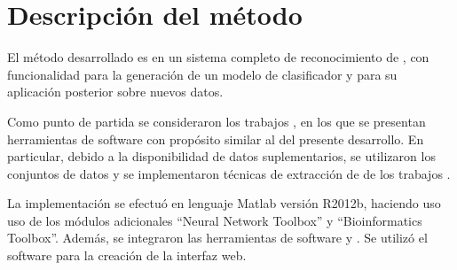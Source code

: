 %
%
%
%
\setcounter{chapter}{2}
%
\chapter{Descripción del método}
%
El método desarrollado es en un sistema completo de reconocimiento de
, con funcionalidad para la generación de un modelo de
clasificador y para su aplicación posterior sobre nuevos datos.

Como punto de partida se consideraron los trabajos
\cite{xue,ng,batuwita,sheng,sewer,ding}, en los que se presentan
herramientas de software con propósito similar al del presente
desarrollo.
En particular, debido a la disponibilidad de datos suplementarios,
se utilizaron los conjuntos de datos y se implementaron técnicas de
extracción de  de los trabajos \cite{xue,ng,batuwita}.

La implementación se efectuó en lenguaje Matlab versión R2012b,
haciendo uso uso de los módulos adicionales ``Neural Network Toolbox''
y ``Bioinformatics Toolbox''.
Además, se integraron las herramientas de software 
\cite{libsvm} y  \cite{vienna}.
Se utilizó el software \work\webdemo{} \cite{webdemobuilder} para
la creación de la interfaz web.
